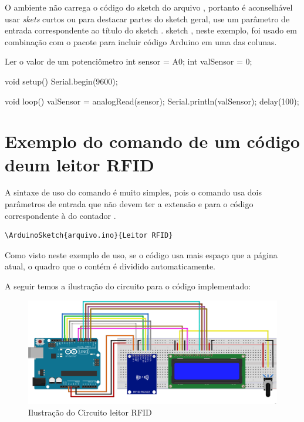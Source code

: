 \documentclass{article}
\begin{document}
\begin{paracol}{2}
O ambiente  não carrega o código do sketch  do arquivo , portanto é aconselhável usar \textit{skets} curtos ou para destacar partes do sketch  geral, use um parâmetro de entrada correspondente ao título do sketch . sketch , neste exemplo, foi usado em combinação com o pacote  para incluir código Arduino em uma das colunas.
\switchcolumn
\begin{ArduinoSketchBox}{Ler o valor de um potenciômetro}
int sensor = A0;
int valSensor = 0;

void setup(){
	Serial.begin(9600);
}

void loop(){
	valSensor = analogRead(sensor);
    Serial.println(valSensor);
    delay(100);
}
\end{ArduinoSketchBox}
\end{paracol}

\newpage

\section{Exemplo do comando  de um código deum leitor RFID}

A sintaxe de uso do comando  é muito simples, pois o comando usa dois parâmetros de entrada  que não devem ter a extensão  e  para o código correspondente à  do contador .

\begin{verbatim}
\ArduinoSketch{arquivo.ino}{Leitor RFID}
\end{verbatim}

Como visto neste exemplo de uso, se o código usa mais espaço que a página atual, o quadro que o contém é dividido automaticamente.


A seguir temos a ilustração do circuito para o código implementado:

\begin{figure}[htb]
	\centering
	\includegraphics[scale=0.2]{Circuito.png}
	\caption{Ilustração do Circuito leitor RFID}
\end{figure}
\end{document}
